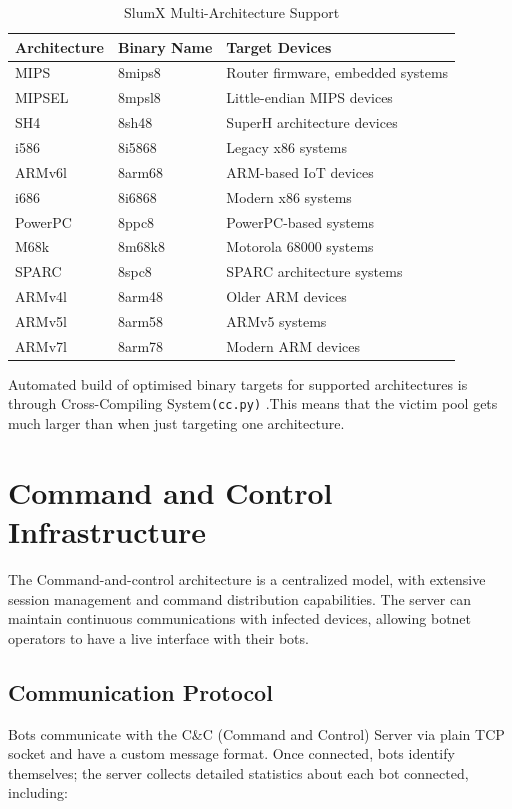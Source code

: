 \documentclass[12pt,letterpaper]{report}
\begin{document}
\begin{table}[H]
\centering
\caption{SlumX Multi-Architecture Support}
\label{tab:architectures}
\begin{tabular}{|l|l|l|}
\hline
\textbf{Architecture} & \textbf{Binary Name} & \textbf{Target Devices} \\
\hline
MIPS & 8mips8 & Router firmware, embedded systems \\
MIPSEL & 8mpsl8 & Little-endian MIPS devices \\
SH4 & 8sh48 & SuperH architecture devices \\
i586 & 8i5868 & Legacy x86 systems \\
ARMv6l & 8arm68 & ARM-based IoT devices \\
i686 & 8i6868 & Modern x86 systems \\
PowerPC & 8ppc8 & PowerPC-based systems \\
M68k & 8m68k8 & Motorola 68000 systems \\
SPARC & 8spc8 & SPARC architecture systems \\
ARMv4l & 8arm48 & Older ARM devices \\
ARMv5l & 8arm58 & ARMv5 systems \\
ARMv7l & 8arm78 & Modern ARM devices \\
\hline
\end{tabular}
\end{table}

Automated build of optimised binary targets for supported architectures is through Cross-Compiling System{\texttt{(cc.py)}} .This means that the victim pool gets much larger than when just targeting one architecture.



\section{Command and Control Infrastructure}

The Command-and-control architecture is a centralized model, with extensive session management and command distribution capabilities. The server can maintain continuous communications with infected devices, allowing botnet operators to have a live interface with their bots.

\subsection{Communication Protocol}

Bots communicate with the C\&C (Command and Control) Server via plain TCP socket and have a custom message format. Once connected, bots identify themselves; the server collects detailed statistics about each bot connected, including:
\end{document}
